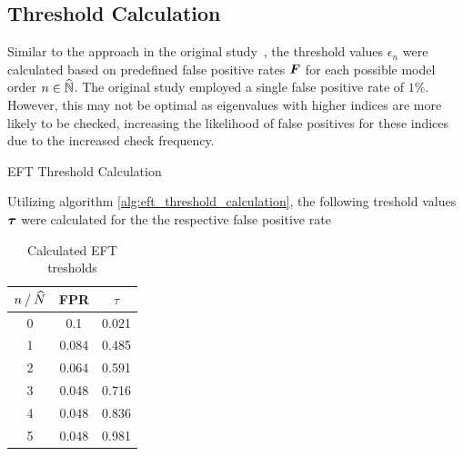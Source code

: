\subsection{Threshold Calculation}
Similar to the approach in the original study~\cite{eft}, the threshold values \( \epsilon_n \) were calculated based on
predefined false positive rates \( \boldsymbol{F} \) for each possible model order \( n \in \widehat{\mathbb{N}} \).
The original study employed a single false positive rate of \( 1 \% \). However, this may not be optimal as eigenvalues
with higher indices are more likely to be checked, increasing the likelihood of false positives for these indices due to
the increased check frequency.

\begin{algorithm}[H]
\label{alg:eft_threshold_calculation}
\caption{EFT Threshold Calculation}
\DontPrintSemicolon
{}

\end{algorithm}

Utilizing algorithm \autoref{alg:eft_threshold_calculation}, the following treshold values \( \boldsymbol{\tau} \) were calculated
for the the respective false positive rate

\begin{table}[h]
    \centering
    \caption{Calculated EFT tresholds}
    \begin{tabular}{ccc}
    \toprule
    \( n \:/\: \widehat{N} \) & FPR & \( \tau \) \\
    \midrule
    0 & 0.1 & 0.021 \\
    1 & 0.084 & 0.485 \\
    2 & 0.064 & 0.591 \\
    3 & 0.048 & 0.716 \\
    4 & 0.048 & 0.836 \\
    5 & 0.048 & 0.981 \\
    \bottomrule
    \end{tabular}
    \label{tab:eft_thresholds}
\end{table}

